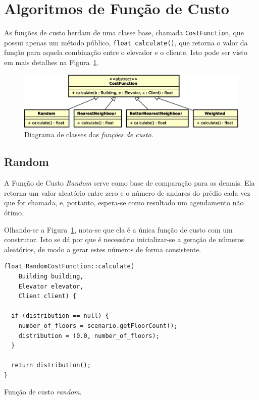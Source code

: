 \section{\label{model:costfunctions}Algoritmos de Função de Custo}
As funções de custo herdam de uma classe base, chamada \texttt{CostFunction},
que possui apenas um método público, \texttt{float calculate()}, que retorna o
valor da função para aquela combinação entre o elevador e o cliente. Isto pode
ser visto em mais detalhes na Figura~\ref{fig:model:costfunction:uml:base}.

\begin{figure}[htb!]
  \centering
  \includegraphics[scale=0.6]{img/CostFunction}
  \caption{Diagrama de classes das \textit{funções de custo}.}
  \label{fig:model:costfunction:uml:base}
\end{figure}

\subsection{\label{model:costfunctions:random}Random}

A Função de Custo \textit{Random} serve como base de comparação para as demais.
Ela retorna um valor aleatório entre zero e o número de andares do prédio cada
vez que for chamada, e, portanto, espera-se como resultado um agendamento não
ótimo.

Olhando-se a Figura~\ref{fig:model:costfunction:uml:base}, nota-se que ela é a
única função de custo com um construtor. Isto se dá por que é necessário
inicializar-se a geração de números aleatórios, de modo a gerar estes números de
forma consistente.

\begin{algorithm}[htb!]
  \centering
  \begin{verbatim}
float RandomCostFunction::calculate(
    Building building,
    Elevator elevator,
    Client client) {

  if (distribution == null) {
    number_of_floors = scenario.getFloorCount();
    distribution = (0.0, number_of_floors);
  }

  return distribution();
}
  \end{verbatim}
  \caption{\label{alg:random_cf}Função de custo \textit{random}.}
\end{algorithm}

